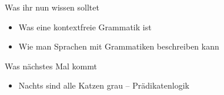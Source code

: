 \begin{frame}
	\begin{block}{Was ihr nun wissen solltet}
		\begin{itemize}
			\item Was eine kontextfreie Grammatik ist
			\item Wie man Sprachen mit Grammatiken beschreiben kann
		\end{itemize}
	\end{block}
	
	\begin{block}{Was nächstes Mal kommt}
		\begin{itemize}
			\item Nachts sind alle Katzen grau -- Prädikatenlogik
		\end{itemize}
	\end{block}
\end{frame}	







\backupend
